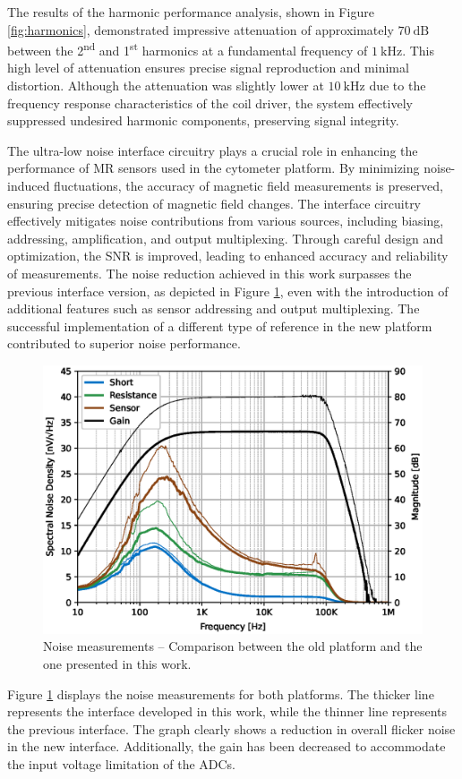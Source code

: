 The results of the harmonic performance analysis, shown in Figure \ref{fig:harmonics}, demonstrated impressive attenuation of approximately $\mathrm{70~dB}$ between the 2\textsuperscript{nd} and 1\textsuperscript{st} harmonics at a fundamental frequency of $\mathrm{1~kHz}$. This high level of attenuation ensures precise signal reproduction and minimal distortion. Although the attenuation was slightly lower at $\mathrm{10~kHz}$ due to the frequency response characteristics of the coil driver, the system effectively suppressed undesired harmonic components, preserving signal integrity.


The ultra-low noise interface circuitry plays a crucial role in enhancing the performance of MR sensors used in the cytometer platform. By minimizing noise-induced fluctuations, the accuracy of magnetic field measurements is preserved, ensuring precise detection of magnetic field changes. The interface circuitry effectively mitigates noise contributions from various sources, including biasing, addressing, amplification, and output multiplexing. Through careful design and optimization, the SNR is improved, leading to enhanced accuracy and reliability of measurements. The noise reduction achieved in this work surpasses the previous interface version, as depicted in Figure \ref{fig:noise}, even with the introduction of additional features such as sensor addressing and output multiplexing. The successful implementation of a different type of reference in the new platform contributed to superior noise performance.

\begin{figure}[!ht]
    \centering
    \includegraphics[width=.475\textwidth]{figs/noise.eps}
    \caption{Noise measurements -- Comparison between the old platform and the one presented in this work.}
    \label{fig:noise}
\end{figure}

Figure \ref{fig:noise} displays the noise measurements for both platforms. The thicker line represents the interface developed in this work, while the thinner line represents the previous interface. The graph clearly shows a reduction in overall flicker noise in the new interface. Additionally, the gain has been decreased to accommodate the input voltage limitation of the ADCs.

